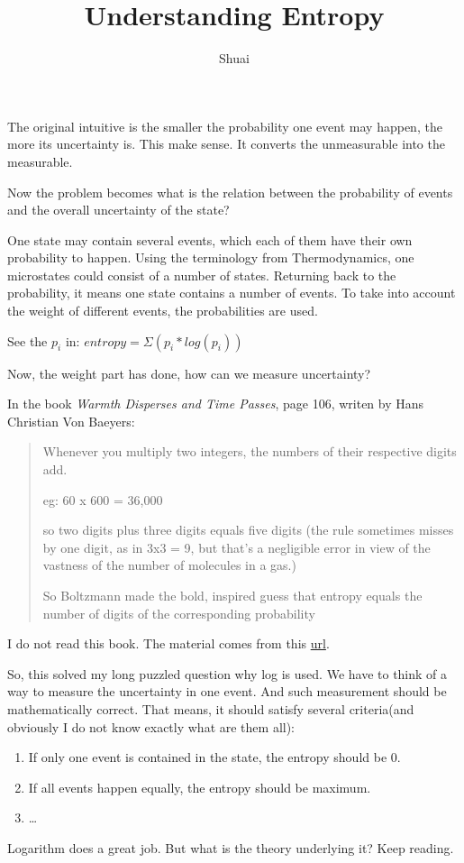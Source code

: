 \documentclass[a4paper]{article}
\title{Understanding Entropy}
\author{Shuai}
\date{}
\begin{document}
\maketitle

The original intuitive is the smaller the probability one event may
happen, the more its uncertainty is. This make sense. It converts the
unmeasurable into the measurable.

Now the problem becomes what is the relation between the probability of
events and the overall uncertainty of the state?

One state may contain several events, which each of them have their own
probability to happen. Using the terminology from Thermodynamics, one
microstates could consist of a number of states. Returning back to the
probability, it means one state contains a number of events. To take
into account the weight of different events, the probabilities are used.

See the $p_i$ in: $entropy = \Sigma(p_i * log(p_i))$

Now, the weight part has done, how can we measure uncertainty?

In the book \emph{Warmth Disperses and Time Passes}, page 106, writen by
Hans Christian Von Baeyers:

\begin{quote}
Whenever you multiply two integers, the numbers of their respective
digits add.

eg: 60 x 600 = 36,000

so two digits plus three digits equals five digits (the rule sometimes
misses by one digit, as in 3x3 = 9, but that's a negligible error in
view of the vastness of the number of molecules in a gas.)

So Boltzmann made the bold, inspired guess that entropy equals the
number of digits of the corresponding probability

\end{quote}
I do not read this book. The material comes from this
\href{http://ask.metafilter.com/128814/Help-me-Understand-Boltzmanns-entropy-formula-S-k-log-W}{url}.

So, this solved my long puzzled question why log is used. We have to
think of a way to measure the uncertainty in one event. And such
measurement should be mathematically correct. That means, it should
satisfy several criteria(and obviously I do not know exactly what are
them all):

\begin{enumerate}[1.]
\item
  If only one event is contained in the state, the entropy should be 0.
\item
  If all events happen equally, the entropy should be maximum.
\item
  \ldots{}
\end{enumerate}
Logarithm does a great job. But what is the theory underlying it? Keep
reading.
\end{document}
